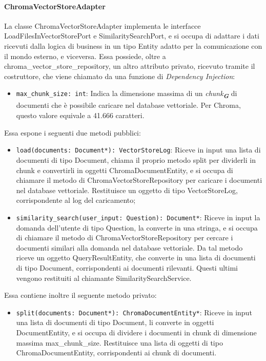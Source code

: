 \paragraph{ChromaVectorStoreAdapter}
\label{sec:chroma_vector_store_adapter}
La classe ChromaVectorStoreAdapter implementa le interfacce LoadFilesInVectorStorePort e SimilaritySearchPort, e si occupa di adattare i dati ricevuti dalla logica di business in un tipo Entity adatto per la comunicazione con il mondo esterno, e viceversa. 
Essa possiede, oltre a chroma\_vector\_store\_repository, un altro attributo privato, ricevuto tramite il costruttore, che viene chiamato da una funzione di \emph{Dependency Injection}:
\begin{itemize}
    \item \texttt{max\_chunk\_size: int}: Indica la dimensione massima di un \emph{chunk}\textsubscript{\textbf{\textit{G}}} di documenti che è possibile caricare nel database vettoriale. Per Chroma, questo valore equivale a 41.666 caratteri.
\end{itemize}
Essa espone i seguenti due metodi pubblici:
\begin{itemize}
    \item \texttt{load(documents: Document*): VectorStoreLog}: Riceve in input una lista di documenti di tipo Document, chiama il proprio metodo split per dividerli in chunk e convertirli in oggetti ChromaDocumentEntity, e si occupa di chiamare il metodo di ChromaVectorStoreRepository per caricare i documenti nel database vettoriale. Restituisce un oggetto di tipo VectorStoreLog, corrispondente al log del caricamento;
    \item \texttt{similarity\_search(user\_input: Question): Document*}: Riceve in input la domanda dell'utente di tipo Question, la converte in una stringa, e si occupa di chiamare il metodo di ChromaVectorStoreRepository per cercare i documenti similari alla domanda nel database vettoriale. Da tal metodo riceve un oggetto QueryResultEntity, che converte in una lista di documenti di tipo Document, corrispondenti ai documenti rilevanti. Questi ultimi vengono restituiti al chiamante SimilaritySearchService.
\end{itemize}
Essa contiene inoltre il seguente metodo privato:
\begin{itemize}
    \item \texttt{split(documents: Document*): ChromaDocumentEntity*}: Riceve in input una lista di documenti di tipo Document, li converte in oggetti DocumentEntity, e si occupa di dividere i documenti in chunk di dimensione massima max\_chunk\_size. Restituisce una lista di oggetti di tipo ChromaDocumentEntity, corrispondenti ai chunk di documenti.
\end{itemize}


